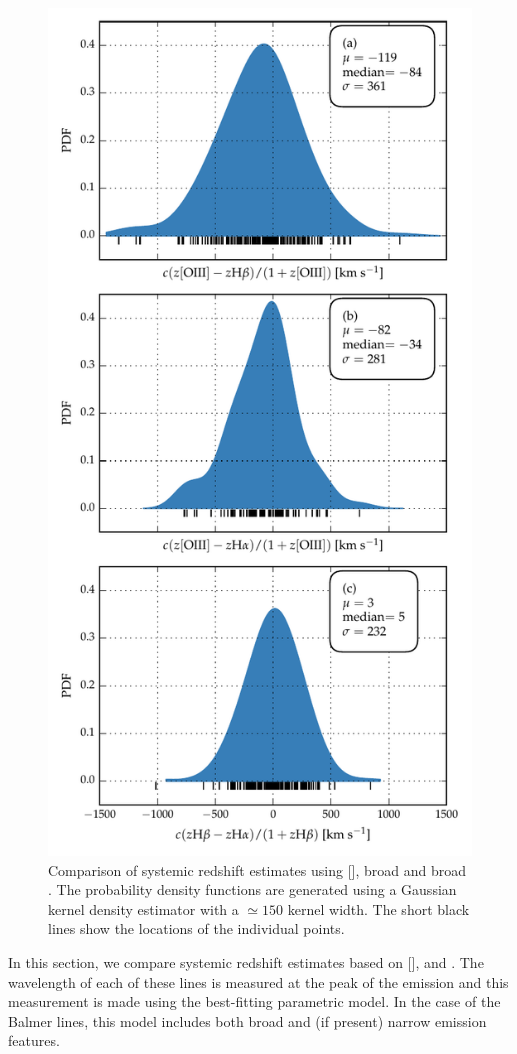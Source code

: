 \begin{figure}
    \centering
    \includegraphics[width=0.8\linewidth]{figures/chapter04/redshift_comparison.pdf} 
    \caption[{Comparison of systemic redshift estimates using [], broad \hb and broad \hans.}]{Comparison of systemic redshift estimates using [], broad \hb and broad \hans. The probability density functions are generated using a Gaussian kernel density estimator with a $\simeq150$ \kms kernel width. The short black lines show the locations of the individual points.}       
    \label{fig:redshift_comparison}
\end{figure}

In this section, we compare systemic redshift estimates based on [], \hb and \hans. 
The wavelength of each of these lines is measured at the peak of the emission and this measurement is made using the best-fitting parametric model. 
In the case of the Balmer lines, this model includes both broad and (if present) narrow emission features. 

